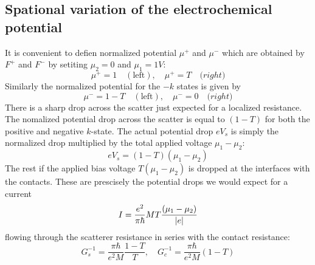 \documentclass[11pt,a4paper]{book}
\theoremstyle{plain}
\theoremstyle{definition}
\theoremstyle{remark}
\begin{document}
\subsection{Spational variation of the electrochemical potential}
It is convenient to defien normalized potential $\mu^+$ and $\mu^-$ which are obtained by $F^+$ and $F^-$ by setiting $\mu_2 = 0$ and $\mu_1 = 1 V$:
\begin{equation}
    \mu^+ = 1 \quad \mathrm{(left)}, \quad \mu^+ = T \quad \mathrm(right)
\end{equation}
Similarly the normalized potential for the $-k$ states is given by
\begin{equation}
    \mu^- = 1 - T \quad \mathrm{(left)}, \quad \mu^- = 0 \quad \mathrm(right)
\end{equation}
There is a sharp drop across the scatter just expected for a localized resistance. The nomalized potential drop across the scatter is equal to $(1-T)$ for both the positive and negative $k$-state. The actual potential drop $eV_s$ is simply the normalized drop multiplied by the total applied voltage $\mu_1-\mu_2$:
\begin{equation}
    e V_s = (1-T)(\mu_1 - \mu_2)
\end{equation}
The rest if the applied bias voltage $T(\mu_1 - \mu_2)$ is dropped at the interfaces with the contacts. These are prescisely the potential drops we would expect for a current
\begin{equation}
    I = \frac{e^2}{\pi \hbar} M T \frac{(\mu_1 - \mu_2)}{\abs{e}}
\end{equation}
flowing through the scatterer resistance in series with the contact resistance:
\begin{equation}
    G_s^{-1} = \frac{\pi \hbar}{e^2 M}\frac{1-T}{T}, \quad G_c^{-1} = \frac{\pi \hbar}{e^2 M} (1 - T)
\end{equation}
\end{document}
